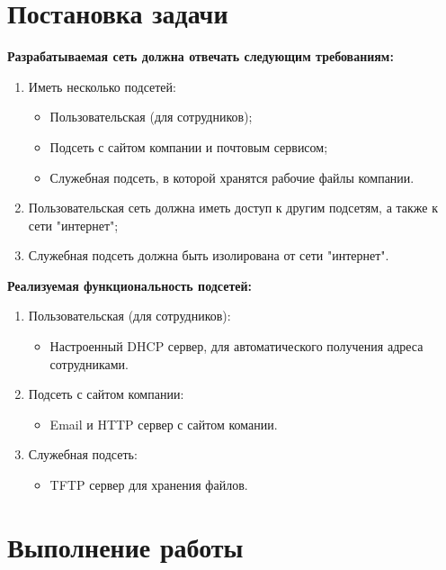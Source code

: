 \section{Постановка задачи}
\textbf{Разрабатываемая сеть должна отвечать следующим требованиям:}
\begin{enumerate}
\item Иметь несколько подсетей:
\begin{itemize}
\item Пользовательская (для сотрудников);
\item Подсеть с сайтом компании и почтовым сервисом;
\item Служебная подсеть, в которой хранятся рабочие файлы компании.
\end{itemize}
\item Пользовательская сеть должна иметь доступ к другим подсетям, а также к сети "интернет";
\item Служебная подсеть должна быть изолирована от сети "интернет".
\end{enumerate}
\textbf{Реализуемая функциональность подсетей:}
\begin{enumerate}
\item Пользовательская (для сотрудников):
\begin{itemize}
\item Настроенный DHCP сервер, для автоматического получения адреса сотрудниками.
\end{itemize}
\item Подсеть с сайтом компании:
\begin{itemize}
\item Email и HTTP сервер с сайтом комании.
\end{itemize}
\item Служебная подсеть:
\begin{itemize}
\item TFTP сервер для хранения файлов.
\end{itemize}
\end{enumerate}


\section{Выполнение работы}

